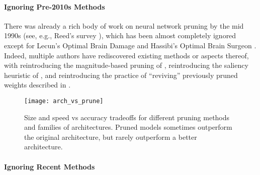 \vspace{-2mm}
\paragraph{Ignoring Pre-2010s Methods}

There was already a rich body of work on neural network pruning by the mid 1990s (see, e.g., Reed's survey \cite{reed_pruning_1993}), which has been almost completely ignored except for Lecun's Optimal Brain Damage \cite{optimal-brain-damage} and Hassibi's Optimal Brain Surgeon \cite{optimal-brain-surgeon}. Indeed, multiple authors have rediscovered existing methods or aspects thereof, with \citet{learning-both} reintroducing the magnitude-based pruning of \citet{janowsky_pruning_1989}, \citet{snip} reintroducing the saliency heuristic of \citet{mozer_skeletonization:_1989}, and \citet{soft-filter-pruning} reintroducing the practice of ``reviving'' previously pruned weights described in \citet{early-brain-damage}.
\begin{figure}[t]
\begin{center}
\texttt{[image: arch\_vs\_prune]}
\vspace{-3mm}
\caption{Size and speed vs accuracy tradeoffs for different pruning methods and families of architectures. Pruned models sometimes outperform the original architecture, but rarely outperform a better architecture.}
\label{fig:arch_vs_prune}
\end{center}
\end{figure}
\vspace{3mm}

\paragraph{Ignoring Recent Methods}

